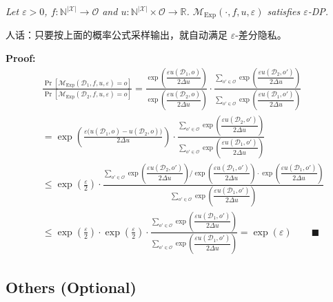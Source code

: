 \documentclass[UTF8]{ctexart}
\begin{document}
\begin{mdframed}[linewidth=1.5pt, linecolor=blue!60, backgroundcolor=blue!5,
    frametitle={\textbf{Theorem 2 (DP guarantees for Exponential Mechanism)}},
    frametitlebackgroundcolor=blue!40, frametitlerule=true]
\textit{Let $\varepsilon > 0$, $f: \mathbb{N}^{|\mathcal{X}|} \to \mathcal{O}$ and $u: \mathbb{N}^{|\mathcal{X}|} \times \mathcal{O} \to \mathbb{R}$. $\mathcal{M}_{\mathrm{Exp}}(\cdot, f, u, \varepsilon)$ satisfies $\varepsilon$-DP.}
\end{mdframed}
人话：只要按上面的概率公式采样输出，就自动满足 $\varepsilon$-差分隐私。

\textbf{Proof:}
\begin{align*}
&\frac{\Pr[\mathcal{M}_{\mathrm{Exp}}(\mathcal{D}_1,f,u,\varepsilon)=o]}{\Pr[\mathcal{M}_{\mathrm{Exp}}(\mathcal{D}_2,f,u,\varepsilon)=o]}
= \frac{\exp\!\left(\dfrac{\varepsilon u(\mathcal{D}_1,o)}{2\Delta u}\right)}{\exp\!\left(\dfrac{\varepsilon u(\mathcal{D}_2,o)}{2\Delta u}\right)}
\cdot \frac{\displaystyle\sum_{o'\in\mathcal{O}}\exp\!\left(\dfrac{\varepsilon u(\mathcal{D}_2,o')}{2\Delta u}\right)}{\displaystyle\sum_{o'\in\mathcal{O}}\exp\!\left(\dfrac{\varepsilon u(\mathcal{D}_1,o')}{2\Delta u}\right)} \\[8pt]
&= \exp\!\left(\frac{\varepsilon\bigl(u(\mathcal{D}_1,o)-u(\mathcal{D}_2,o)\bigr)}{2\Delta u}\right)
\cdot \frac{\displaystyle\sum_{o'\in\mathcal{O}}\exp\!\left(\dfrac{\varepsilon u(\mathcal{D}_2,o')}{2\Delta u}\right)}{\displaystyle\sum_{o'\in\mathcal{O}}\exp\!\left(\dfrac{\varepsilon u(\mathcal{D}_1,o')}{2\Delta u}\right)} \\[8pt]
&\leq \exp\!\left(\frac{\varepsilon}{2}\right)
\cdot \frac{\displaystyle\sum_{o'\in\mathcal{O}}\exp\!\left(\dfrac{\varepsilon u(\mathcal{D}_2,o')}{2\Delta u}\right) / \exp\!\left(\dfrac{\varepsilon u(\mathcal{D}_1,o')}{2\Delta u}\right) \cdot \exp\!\left(\dfrac{\varepsilon u(\mathcal{D}_1,o')}{2\Delta u}\right)}{\displaystyle\sum_{o'\in\mathcal{O}}\exp\!\left(\dfrac{\varepsilon u(\mathcal{D}_1,o')}{2\Delta u}\right)} \\[8pt]
&\leq \exp\!\left(\frac{\varepsilon}{2}\right) \cdot \exp\!\left(\frac{\varepsilon}{2}\right)
\cdot \frac{\displaystyle\sum_{o'\in\mathcal{O}}\exp\!\left(\dfrac{\varepsilon u(\mathcal{D}_1,o')}{2\Delta u}\right)}{\displaystyle\sum_{o'\in\mathcal{O}}\exp\!\left(\dfrac{\varepsilon u(\mathcal{D}_1,o')}{2\Delta u}\right)}
= \exp(\varepsilon) \qquad \blacksquare
\end{align*}

\subsection{Others (Optional)}
\end{document}
